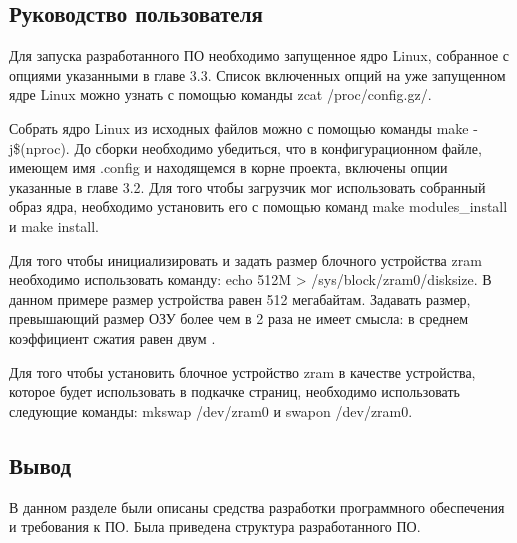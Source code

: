 
\subsection{Руководство пользователя}

Для запуска разработанного ПО необходимо запущенное ядро Linux, собранное с опциями указанными в главе 3.3. Список включенных опций на уже запущенном ядре Linux можно узнать с помощью команды zcat /proc/config.gz/.

Собрать ядро Linux из исходных файлов можно с помощью команды make -j\$(nproc). До сборки необходимо убедиться, что в конфигурационном файле, имеющем имя .config и находящемся в корне проекта, включены опции указанные в главе 3.2. Для того чтобы загрузчик мог использовать собранный образ ядра, необходимо установить его с помощью команд  make modules\_install и make install.

Для того чтобы инициализировать и задать размер блочного устройства zram необходимо использовать команду: echo 512M > /sys/block/zram0/disksize. В данном примере размер устройства равен 512 мегабайтам. Задавать размер, превышающий размер ОЗУ более чем в 2 раза не имеет смысла: в среднем коэффициент сжатия равен двум \cite{zram}.

Для того чтобы установить блочное устройство zram в качестве устройства, которое будет использовать в подкачке страниц, необходимо использовать следующие команды: mkswap /dev/zram0 и swapon /dev/zram0.

\subsection{Вывод}

В данном разделе были описаны средства разработки программного обеспечения и требования к ПО. Была приведена структура разработанного ПО.
\pagebreak